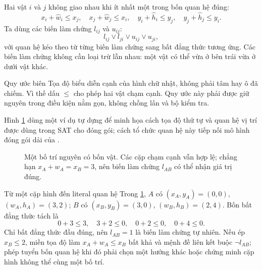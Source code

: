 Hai vật \(i\) và \(j\) không giao nhau khi ít nhất một trong bốn quan hệ đúng:
\[
  x_i+\widehat w_i\le x_j,\quad
  x_j+\widehat w_j\le x_i,\quad
  y_i+\widehat h_i\le y_j,\quad
  y_j+\widehat h_j\le y_i.
\]
Ta dùng các biến làm chứng \(l_{ij}\) và \(u_{ij}\):
\[
  l_{ij}\lor l_{ji}\lor u_{ij}\lor u_{ji},
\]
với quan hệ kéo theo từ từng biến làm chứng sang bất đẳng thức tương ứng. Các
biến làm chứng không cần loại trừ lẫn nhau: một vật có thể vừa ở bên trái vừa ở dưới vật
khác.

\begin{designrule}{Quy ước biên}
Tọa độ biểu diễn cạnh của hình chữ nhật, không phải tâm hay ô đã chiếm. Vì thế
dấu \(\le\) cho phép hai vật chạm cạnh. Quy ước này phải được giữ nguyên trong
điều kiện nằm gọn, không chồng lấn và bộ kiểm tra.
\end{designrule}

Hình \ref{fig:packing-layout} dùng một ví dụ tự dựng để minh họa cách tọa độ
thứ tự và quan hệ vị trí được dùng trong SAT cho đóng gói; cách tổ chức quan hệ
này tiếp nối mô hình đóng gói dải của \textcite{soh2010strip}.

\begin{figure}[tb]
\centering
{}
\caption{Một bố trí nguyên có bốn vật. Các cặp chạm cạnh vẫn hợp lệ; chẳng hạn
\(x_A+w_A=x_B=3\), nên biến làm chứng \(l_{AB}\) có thể nhận giá trị đúng.}
\label{fig:packing-layout}
\end{figure}

\begin{workedexample}{Từ một cặp hình đến literal quan hệ}
Trong \cref{fig:packing-layout}, \(A\) có \((x_A,y_A)=(0,0)\),
\((w_A,h_A)=(3,2)\); \(B\) có \((x_B,y_B)=(3,0)\),
\((w_B,h_B)=(2,4)\). Bốn bất đẳng thức tách là
\[
  0+3\le3,\quad 3+2\le0,\quad 0+2\le0,\quad 0+4\le0.
\]
Chỉ bất đẳng thức đầu đúng, nên \(l_{AB}=1\) là biến làm chứng tự nhiên. Nếu ép
\(x_B\le2\), miền tọa độ làm \(x_A+w_A\le x_B\) bất khả và mệnh đề liên kết
buộc \(\neg l_{AB}\); phép tuyển bốn quan hệ khi đó phải chọn một hướng khác
hoặc chứng minh cặp hình không thể cùng một bố trí.
\end{workedexample}

